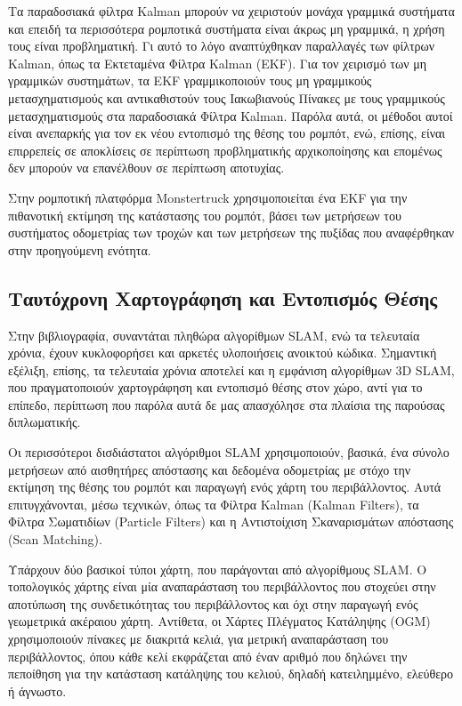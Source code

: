 \bigskip
Τα παραδοσιακά φίλτρα Kalman μπορούν να χειριστούν μονάχα γραμμικά συστήματα και επειδή τα περισσότερα ρομποτικά συστήματα είναι άκρως μη γραμμικά, η χρήση τους είναι προβληματική. Γι αυτό το λόγο αναπτύχθηκαν παραλλαγές των φίλτρων Kalman, όπως τα {Εκτεταμένα Φίλτρα Kalman} ({EKF}). Για τον χειρισμό των μη γραμμικών συστημάτων, τα {EKF} γραμμικοποιούν τους μη γραμμικούς μετασχηματισμούς και αντικαθιστούν τους Ιακωβιανούς Πίνακες με τους γραμμικούς μετασχηματισμούς στα παραδοσιακά Φίλτρα Kalman. Παρόλα αυτά, οι μέθοδοι αυτοί είναι ανεπαρκής για τον εκ νέου εντοπισμό της θέσης του ρομπότ, ενώ, επίσης, είναι επιρρεπείς σε αποκλίσεις σε περίπτωση προβληματικής αρχικοποίησης και επομένως δεν μπορούν να επανέλθουν σε περίπτωση αποτυχίας.

\bigskip
Στην ρομποτική πλατφόρμα {Monstertruck} χρησιμοποιείται ένα EKF για την πιθανοτική εκτίμηση της κατάστασης του ρομπότ, βάσει των μετρήσεων του συστήματος οδομετρίας των τροχών και των μετρήσεων της πυξίδας που αναφέρθηκαν στην προηγούμενη ενότητα.

\bigskip
\subsection{Ταυτόχρονη Χαρτογράφηση και Εντοπισμός Θέσης} \label{ssec:slam}
Στην βιβλιογραφία, συναντάται πληθώρα αλγορίθμων SLAM, ενώ τα τελευταία χρόνια, έχουν κυκλοφορήσει και αρκετές υλοποιήσεις ανοικτού κώδικα. Σημαντική εξέλιξη, επίσης, τα τελευταία χρόνια αποτελεί και η εμφάνιση αλγορίθμων 3D SLAM, που πραγματοποιούν χαρτογράφηση και εντοπισμό θέσης στον χώρο, αντί για το επίπεδο, περίπτωση που παρόλα αυτά δε μας απασχόλησε στα πλαίσια της παρούσας διπλωματικής.

\bigskip
Οι περισσότεροι δισδιάστατοι αλγόριθμοι SLAM χρησιμοποιούν, βασικά, ένα σύνολο μετρήσεων από αισθητήρες απόστασης και δεδομένα οδομετρίας με στόχο την εκτίμηση της θέσης του ρομπότ και παραγωγή ενός χάρτη του περιβάλλοντος.  Αυτά επιτυγχάνονται, μέσω τεχνικών, όπως τα {Φίλτρα Kalman} ({Kalman Filters}), τα {Φίλτρα Σωματιδίων} ({Particle Filters}) και η {Αντιστοίχιση Σκαναρισμάτων} απόστασης ({Scan Matching}).

\bigskip
Υπάρχουν δύο βασικοί τύποι χάρτη, που παράγονται από αλγορίθμους {SLAM}. Ο τοπολογικός χάρτης είναι μία αναπαράσταση του περιβάλλοντος που στοχεύει στην αποτύπωση της συνδετικότητας του περιβάλλοντος και όχι στην παραγωγή ενός γεωμετρικά ακέραιου χάρτη. Αντίθετα, οι Χάρτες Πλέγματος Κατάληψης (OGM) χρησιμοποιούν πίνακες με διακριτά κελιά, για μετρική αναπαράσταση του περιβάλλοντος, όπου κάθε κελί εκφράζεται από έναν αριθμό που δηλώνει την πεποίθηση για την κατάσταση κατάληψης του κελιού, δηλαδή κατειλημμένο, ελεύθερο ή άγνωστο.

